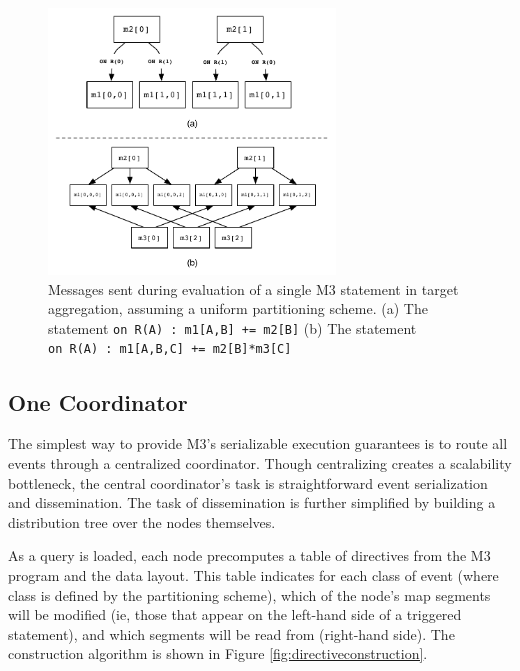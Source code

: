 \documentclass{vldb}
\begin{document}
\begin{figure}
\begin{center}
\includegraphics[width=3in]{graphics/message_passing}
\caption{Messages sent during evaluation of a single M3 statement in target aggregation, assuming a uniform partitioning scheme.  (a) The statement \texttt{on~R(A)~:~m1[A,B]~+=~m2[B]} (b) The statement \texttt{on~R(A)~:~m1[A,B,C]~+=~m2[B]*m3[C]} }
\label{fig:messagepassing}
\end{center}
\end{figure}

\subsection{One Coordinator}
The simplest way to provide M3's serializable execution guarantees is to route all events through a centralized coordinator.  Though centralizing creates a scalability bottleneck, the central coordinator's task is straightforward event serialization and dissemination.  The task of dissemination is further simplified by building a distribution tree over the nodes themselves.

As a query is loaded, each node precomputes a table of directives from the M3 program and the data layout.  This table indicates for each class of event (where class is defined by the partitioning scheme), which of the node's map segments will be modified (ie, those that appear on the left-hand side of a triggered statement), and which segments will be read from (right-hand side).  The construction algorithm is shown in Figure \ref{fig:directiveconstruction}.
\end{document}
